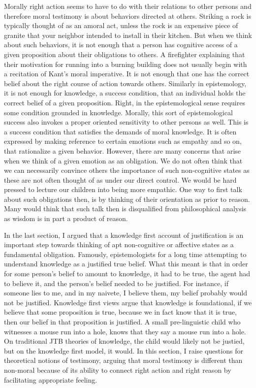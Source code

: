 \documentclass[phdthesis,12pt,final]{wuthesis}
\theoremstyle{definition}
\theoremstyle{definition}
\theoremstyle{definition}
\theoremstyle{definition}
\theoremstyle{remark}
\begin{document}
Morally right action seems to have to do with their relations to other persons and therefore moral testimony is about behaviors directed at others. Striking a rock is typically thought of as an amoral act, unless the rock is an expensive piece of granite that your neighbor intended to install in their kitchen. But when we think about such behaviors, it is not enough that a person has cognitive access of a given proposition about their obligations to others. A firefighter explaining that their motivation for running into a burning building does not usually begin with a recitation of Kant's moral imperative. It is not enough that one has the correct belief about the right course of action towards others. Similarly in epistemology, it is not enough for knowledge, a success condition, that an individual holds the correct belief of a given proposition. Right, in the epistemological sense requires some condition grounded in knowledge. Morally, this sort of epistemological success also invokes a proper oriented sensitivity to other persons as well. This is a success condition that satisfies the demands of moral knowledge. It is often expressed by making reference to certain emotions such as empathy and so on, that rationalize a given behavior. However, there are many concerns that arise when we think of a given emotion as an obligation. We do not often think that we can necessarily convince others the importance of such non-cognitive states as these are not often thought of as under our direct control. We would be hard pressed to lecture our children into being more empathic. One way to first talk about such obligations then, is by thinking of their orientation as prior to reason. Many would think that such talk then is disqualified from philosophical analysis as wisdom is in part a product of reason.

In the last section, I argued that a knowledge first account of justification is an important step towards thinking of apt non-cognitive or affective states as a fundamental obligation. Famously, epistemologists for a long time attempting to understand knowledge as a justified true belief. What this meant is that in order for some person's belief to amount to knowledge, it had to be true, the agent had to believe it, and the person's belief needed to be justified. For instance, if someone lies to me, and in my naivete, I believe them, my belief probably would not be justified. Knowledge first views argue that knowledge is foundational, if we believe that some proposition is true, because we in fact know that it is true, then our belief in that proposition is justified. A small pre-linguistic child who witnesses a mouse run into a hole, knows that they say a mouse run into a hole. On traditional JTB theories of knowledge, the child would likely not be justied, but on the knowledge first model, it would. In this section, I raise questions for theoretical notions of testimony, arguing that moral testimony is different than non-moral because of its ability to connect right action and right reason by facilitating appropriate feeling.
\end{document}
